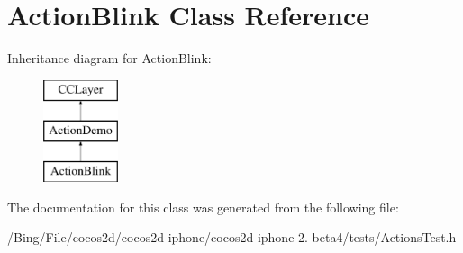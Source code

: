 \hypertarget{interface_action_blink}{\section{Action\-Blink Class Reference}
\label{interface_action_blink}
}
Inheritance diagram for Action\-Blink\-:\begin{figure}[H]
\begin{center}
\leavevmode
\includegraphics[height=3.000000cm]{interface_action_blink}
\end{center}
\end{figure}


The documentation for this class was generated from the following file\-:\begin{DoxyCompactItemize}
\item 
/\-Bing/\-File/cocos2d/cocos2d-\/iphone/cocos2d-\/iphone-\/2.-\/beta4/tests/Actions\-Test.\-h\end{DoxyCompactItemize}
